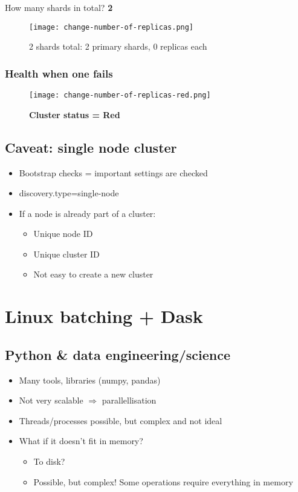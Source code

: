 \documentclass{article}
\begin{document}
How many shards in total? \textbf{2}

\begin{figure}[H]
    \centering
    \texttt{[image: change-number-of-replicas.png]}
    \caption{2 shards total: 2 primary shards, 0 replicas each}
\end{figure}

\subsubsection{Health when one fails}

\begin{figure}[H]
    \centering
    \texttt{[image: change-number-of-replicas-red.png]}
    \caption{\textbf{Cluster status = Red}}
\end{figure}

\subsection{Caveat: single node cluster}

\begin{itemize}
    \item Bootstrap checks = important settings are checked
    \item discovery.type=single-node
    \item If a node is already part of a cluster:
    \begin{itemize}
        \item Unique node ID
        \item Unique cluster ID
        \item Not easy to create a new cluster
    \end{itemize}
\end{itemize}

\section{Linux batching + Dask}

\subsection{Python \& data engineering/science}

\begin{itemize}
    \item Many tools, libraries (numpy, pandas)
    \item Not very scalable $\Rightarrow$ parallellisation
    \item Threads/processes possible, but complex and not ideal
    \item What if it doesn't fit in memory?
    \begin{itemize}
        \item To disk?
        \item Possible, but complex! Some operations require everything in memory
    \end{itemize}
\end{itemize}
\end{document}
